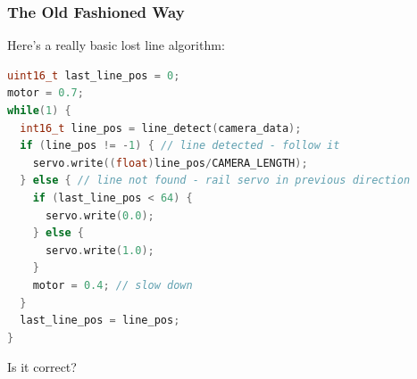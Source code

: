 \documentclass{beamer}
\begin{document}
\begin{frame}[fragile]
\frametitle{The Old Fashioned Way}
Here's a really basic lost line algorithm:
\begin{lstlisting}[language=C++,basicstyle=\ttfamily\scriptsize]
uint16_t last_line_pos = 0;
motor = 0.7;
while(1) {
  int16_t line_pos = line_detect(camera_data);
  if (line_pos != -1) { // line detected - follow it
    servo.write((float)line_pos/CAMERA_LENGTH);
  } else { // line not found - rail servo in previous direction
    if (last_line_pos < 64) {
      servo.write(0.0);
    } else {
      servo.write(1.0);
    }
    motor = 0.4; // slow down
  }
  last_line_pos = line_pos;
}
\end{lstlisting}
Is it correct?
\end{frame}
\end{document}
